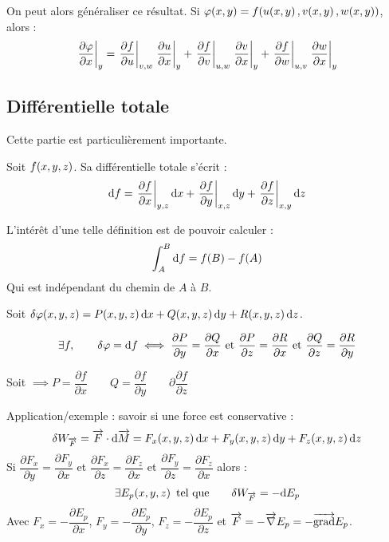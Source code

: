 \documentclass[a4paper,french,bookmarks]{book}
\begin{document}
    On peut alors généraliser ce résultat. Si $\varphi\!\left(x, y\right) = f\!\left(u\!\left(x, y\right), v\!\left(x, y\right), w\!\left(x, y\right)\right)$, alors :
    \[ \left.\dfrac{\partial \varphi}{\partial x}\right\vert_y = \left.\dfrac{\partial f}{\partial u}\right\vert_{v, w}\left.\dfrac{\partial u}{\partial x}\right\vert_y + \left.\dfrac{\partial f}{\partial v}\right\vert_{u, w}\left.\dfrac{\partial v}{\partial x}\right\vert_y + \left.\dfrac{\partial f}{\partial w}\right\vert_{u, v}\left.\dfrac{\partial w}{\partial x}\right\vert_y\]
    
    \subsection{Différentielle totale}
    
    Cette partie est particulièrement importante.
    
    \begin{definition}{}{}
        Soit $f\!\left(x, y, z\right)$. Sa différentielle totale s'écrit :
        \[ \mathrm d f = \left.\dfrac{\partial f}{\partial x}\right\vert_{y, z} \mathrm d x + \left.\dfrac{\partial f}{\partial y}\right\vert_{x, z} \mathrm d y + \left.\dfrac{\partial f}{\partial z}\right\vert_{x, y} \mathrm d z \]
    \end{definition}
    
    L'intérêt d'une telle définition est de pouvoir calculer :
    \[ \int_A^B \mathrm d f = f\!\left(B\right) - f\!\left(A\right)\]
    Qui est indépendant du chemin de $A$ à $B$.
    
    \begin{theorem}{}{}
        Soit $\delta \varphi\!\left(x, y, z\right) = P\!\left(x, y, z\right)\mathrm d x + Q\!\left(x, y, z\right)\mathrm d y + R\!\left(x, y, z\right)\mathrm d z$.
        
        \[ \exists f,\qquad \delta \varphi = \mathrm d f \iff \dfrac{\partial P}{\partial y} = \dfrac{\partial Q}{\partial x} \ \text{et} \  \dfrac{\partial P}{\partial z} = \dfrac{\partial R}{\partial x} \ \text{et} \  \dfrac{\partial Q}{\partial z} = \dfrac{\partial R}{\partial y}\]
        
        Soit $\implies P = \dfrac{\partial f}{\partial x} \qquad Q = \dfrac{\partial f}{\partial y} \qquad \partial \dfrac{\partial f}{\partial z}$
    \end{theorem}
    
    Application/exemple : savoir si une force est conservative :
    \[ \delta W_{\overrightarrow{F}} = \overrightarrow{F} \cdot \mathrm d \overrightarrow{M} = F_x\!\left(x, y, z\right)\mathrm d x + F_y\!\left(x, y, z\right)\mathrm d y + F_z\!\left(x, y, z\right)\mathrm d z\]
    Si $\dfrac{\partial F_x}{\partial y} = \dfrac{\partial F_y}{\partial x}$ et $\dfrac{\partial F_x}{\partial z} = \dfrac{\partial F_z}{\partial x}$ et $\dfrac{\partial F_y}{\partial z} = \dfrac{\partial F_z}{\partial x}$ alors :
    \[ \exists E_p\!\left(x, y, z\right) \ \text{tel que}\qquad \delta W_{\overrightarrow{F}} = -\mathrm d E_p\]
    Avec $F_x = -\dfrac{\partial E_p}{\partial x}$, $F_y = -\dfrac{\partial E_p}{\partial y}$, $F_z = -\dfrac{\partial E_p}{\partial z}$ et $\overrightarrow{F} = -\overrightarrow{\nabla} E_p = -\overrightarrow{\operatorname{grad}} E_p$.
    
\end{document}
